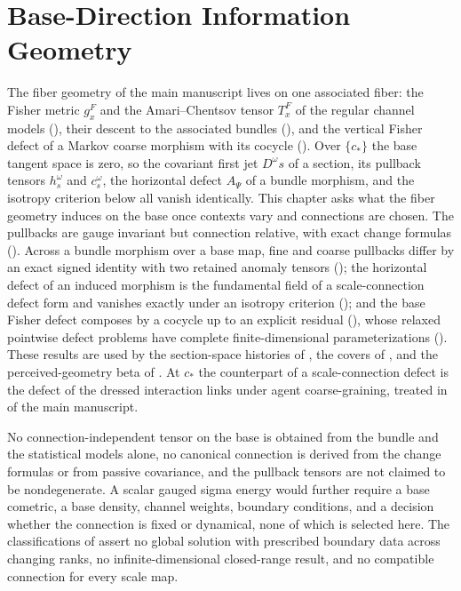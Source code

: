 \chapter{Base-Direction Information Geometry}
\label{ch:pullback-geometry}

The fiber geometry of the main manuscript lives on one associated fiber: the Fisher metric
\(g^F_x\) and the Amari--Chentsov tensor \(T^F_x\) of the regular channel models
(), their descent to the associated bundles
(), and the vertical Fisher defect of a Markov coarse
morphism with its cocycle (). Over
\(\{c_*\}\) the base tangent space is zero, so the covariant first jet \(D^\omega s\) of a section,
its pullback tensors \(h_s^\omega\) and \(c_s^\omega\), the horizontal defect \(A_\Psi\) of a
bundle morphism, and the isotropy criterion below all vanish identically. This chapter asks what the
fiber geometry induces on the base once contexts vary and connections are chosen. The pullbacks are
gauge invariant but connection relative, with exact change formulas
(). Across a bundle
morphism over a base map, fine and coarse pullbacks differ by an exact signed identity with two
retained anomaly tensors (); the horizontal defect of an induced
morphism is the fundamental field of a scale-connection defect form and vanishes exactly under an
isotropy criterion (); and the base Fisher defect composes by a
cocycle up to an explicit residual (), whose relaxed pointwise
defect problems have complete finite-dimensional parameterizations
(). These
results are used by the section-space histories of , the covers of
, and the perceived-geometry beta of . At
\(c_*\) the counterpart of a scale-connection defect is the defect of the dressed interaction links
under agent coarse-graining, treated in  of the main manuscript.

No connection-independent tensor on the base is obtained from the bundle and the statistical models
alone, no canonical connection is derived from the change formulas or from passive covariance, and
the pullback tensors are not claimed to be nondegenerate. A scalar gauged sigma energy would further
require a base cometric, a base density, channel weights, boundary conditions, and a decision whether
the connection is fixed or dynamical, none of which is selected here. The classifications of
 assert no global solution with prescribed boundary data
across changing ranks, no infinite-dimensional closed-range result, and no compatible connection for
every scale map. 

